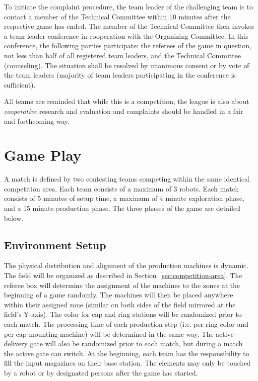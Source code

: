 \documentclass[12pt,twoside]{article}
\newcommand{\refsec}[1]{Section~\ref{#1}}
\begin{document}
To initiate the complaint procedure, the team leader of the
challenging team is to contact a member of the Technical Committee
within 10 minutes after the respective game has ended. The member of
the Technical Committee then invokes a team leader conference in
cooperation with the Organizing Committee. In this conference, the
following parties participate: the referees of the game in question,
not less than half of all registered team leaders, and the Technical
Committee (counseling). The situation shall be resolved by unanimous
consent or by vote of the team leaders (majority of team leaders
participating in the conference is sufficient).

All teams are reminded that while this is a competition, the league is
also about \emph{cooperative} research and evaluation and complaints
should be handled in a fair and forthcoming way.

\section{Game Play}
A match is defined by two contesting teams competing within the same
identical competition area. Each team consists of a maximum of 3
robots. Each match consists of 5 minutes of setup time, a maximum of 4
minute exploration phase, and a 15 minute production phase.
The three phases of the game are detailed below.

\subsection{Environment Setup}
\label{sec:env-setup}
The physical distribution and alignment of the production machines is
dynamic. The field will be organized as described in
\refsec{sec:competition-area}. The referee box will determine the
assignment of the machines to the zones at the beginning of a game
randomly. The machines will then be placed anywhere within their
assigned zone (similar on both sides of the field mirrored at the
field's Y-axis). The color for cap and ring stations will be
randomized prior to each match. The processing time of each production
step (i.e. per ring color and per cap mounting machine) will be
determined in the same way. The active delivery gate will also be
randomized prior to each match, but during a match the active gate can
switch. At the beginning, each team has the responsibility to fill the
input magazines on their base station. The elements may only be
touched by a robot or by designated persons after the game has started.
\end{document}
